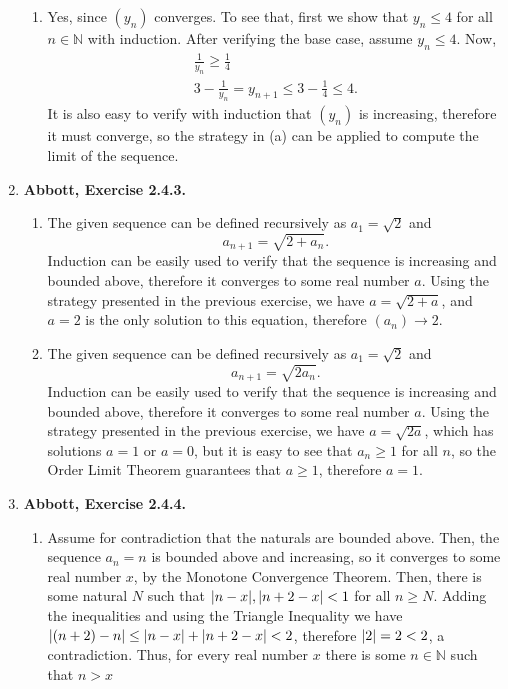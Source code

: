 \documentclass{article}
\DeclarePairedDelimiter\abs{\lvert}{\rvert}
\newcommand{\N}{\mathbb{N}}
\newcommand{\ra}{\rightarrow}
\newcommand{\exc}[2][Abbott]{\item \textbf{#1, Exercise #2.}}
\begin{document}
\begin{enumerate}
\begin{enumerate}
        \item Yes, since $(y_n)$ converges. To see that, first we show that $y_n \leq 4$ for all $n \in \N$ with induction. After verifying the base case, assume $y_n \leq 4$. Now, \begin{gather*}
            \frac{1}{y_n} \geq \frac{1}{4} \\ 
            3 - \frac{1}{y_n} = y_{n+1} \leq 3-\frac{1}{4} \leq 4.
        \end{gather*} It is also easy to verify with induction that $(y_n)$ is increasing, therefore it must converge, so the strategy in (a) can be applied to compute the limit of the sequence.
    \end{enumerate}
    
    \exc{2.4.3} 
    \begin{enumerate}
        \item The given sequence can be defined recursively as $a_1 = \sqrt{2}$ and
        \begin{equation*}
            a_{n+1} = \sqrt{2 + a_n}.
        \end{equation*} Induction can be easily used to verify that the sequence is increasing and bounded above, therefore it converges to some real number $a$. Using the strategy presented in the previous exercise, we have $a = \sqrt{2 + a}$, and $a=2$ is the only solution to this equation, therefore $(a_n) \ra 2$.
        
        \item The given sequence can be defined recursively as $a_1 = \sqrt{2}$ and
        \begin{equation*}
            a_{n+1} = \sqrt{2 a_n}.
        \end{equation*} Induction can be easily used to verify that the sequence is increasing and bounded above, therefore it converges to some real number $a$. Using the strategy presented in the previous exercise, we have $a = \sqrt{2a}$, which has solutions $a = 1$ or $a = 0$, but it is easy to see that $a_n \geq 1$ for all $n$, so the Order Limit Theorem guarantees that $a \geq 1$, therefore $a = 1$.
    \end{enumerate}
    
    \exc{2.4.4}
    \begin{enumerate}
        \item Assume for contradiction that the naturals are bounded above. Then, the sequence $a_n = n$ is bounded above and increasing, so it converges to some real number $x$, by the Monotone Convergence Theorem. Then, there is some natural $N$ such that $\abs*{n-x}, \abs*{n+2-x} < 1$ for all $n \geq N$. Adding the inequalities and using the Triangle Inequality we have $\abs*{(n+2)-n} \leq \abs*{n-x}+\abs*{n+2-x} < 2$, therefore $\abs*{2}=2 < 2$, a contradiction. Thus, for every real number $x$ there is some $n \in \N$ such that $n > x$
        

\end{enumerate}
\end{enumerate}
\end{document}
